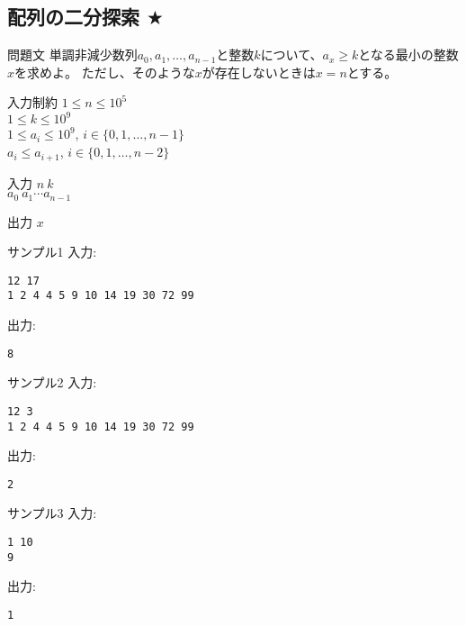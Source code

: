 \documentclass[a4paper,twoside,onecolumn,openany,article,10pt]{memoir}
\theoremstyle{remark}
\begin{document}
\subsection{配列の二分探索 $\bigstar$}
\begin{itembox}[l]{問題文}
単調非減少数列$a_0, a_1,\dotsc, a_{n-1}$と整数$k$について、$a_x\ge k$となる最小の整数$x$を求めよ。
ただし、そのような$x$が存在しないときは$x=n$とする。
\end{itembox}

\begin{itembox}[l]{入力制約}
$1\le n\le 10^5$\\
$1\le k\le 10^9$\\
$1\le a_i\le 10^9$,\hspace{2em} $i\in\{0,1,\dotsc,n-1\}$\\
$a_i\le a_{i+1}$,\hspace{2em} $i\in\{0,1,\dotsc,n-2\}$
\end{itembox}

\begin{itembox}[l]{入力}
$n~k$\\
$a_0~a_1 \dotsb a_{n-1}$
\end{itembox}

\begin{itembox}[l]{出力}
$x$
\end{itembox}

\noindent
\begin{minipage}[t]{0.5\hsize}
\begin{itembox}[l]{サンプル1}
入力:
\begin{verbatim}
12 17
1 2 4 4 5 9 10 14 19 30 72 99
\end{verbatim}
出力:
\begin{verbatim}
8
\end{verbatim}
\end{itembox}
\end{minipage}
%
\begin{minipage}[t]{0.5\hsize}
\begin{itembox}[l]{サンプル2}
入力:
\begin{verbatim}
12 3
1 2 4 4 5 9 10 14 19 30 72 99
\end{verbatim}
出力:
\begin{verbatim}
2
\end{verbatim}
\end{itembox}
\end{minipage}

\begin{itembox}[l]{サンプル3}
入力:
\begin{verbatim}
1 10
9
\end{verbatim}
出力:
\begin{verbatim}
1
\end{verbatim}
\end{itembox}
\end{document}
